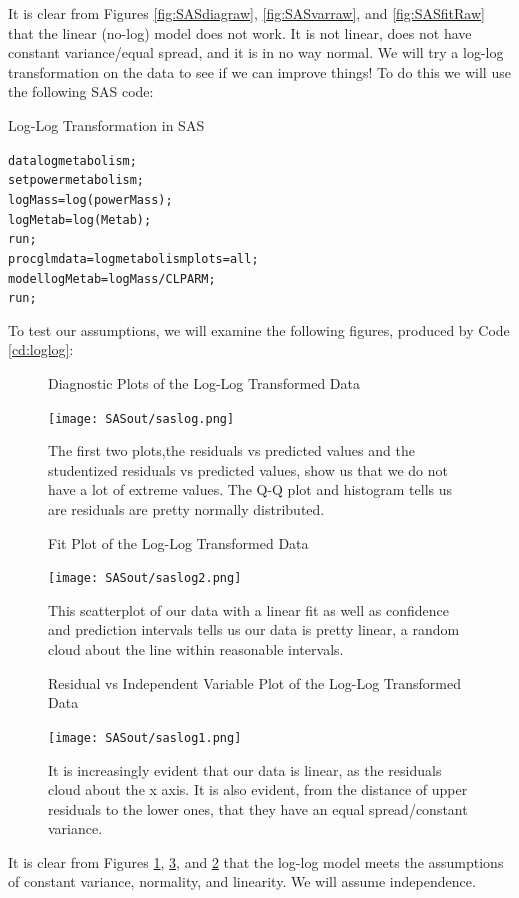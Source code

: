 \documentclass[english]{article}\usepackage[]{graphicx}\usepackage[]{color}
\makeatletter
\newenvironment{kframe}{%
 \def\at@end@of@kframe{}%
 \ifinner\ifhmode%
  \def\at@end@of@kframe{\end{minipage}}%
  \begin{minipage}{\columnwidth}%
 \fi\fi%
 \def\FrameCommand##1{\hskip\@totalleftmargin \hskip-\fboxsep
 \colorbox{shadecolor}{##1}\hskip-\fboxsep
     \hskip-\linewidth \hskip-\@totalleftmargin \hskip\columnwidth}%
 \MakeFramed {\advance\hsize-\width
   \@totalleftmargin\z@ \linewidth\hsize
   \@setminipage}}%
 {\par\unskip\endMakeFramed%
 \at@end@of@kframe}
\newenvironment{knitrout}{}{} %
\makeatother
\begin{document}
It is clear from Figures \ref{fig:SASdiagraw}, \ref{fig:SASvarraw}, and \ref{fig:SASfitRaw} that the linear (no-log) model does not work. It is not linear, does not have constant variance/equal spread, and it is in no way normal. We will try a log-log transformation on the data to see if we can improve things! To do this we will use the following SAS code:
\begin{Code}[H]
	\caption{Log-Log Transformation in SAS}
	\label{cd:loglog}
\begin{knitrout}
\color{fgcolor}\begin{kframe}
\begin{alltt}
data logmetabolism;
set powermetabolism;
logMass=log(powerMass);
logMetab=log(Metab);
run;
proc glm data=logmetabolism plots=all;
model logMetab=logMass /CLPARM;
run;
\end{alltt}
\end{kframe}
\end{knitrout}
\end{Code}
To test our assumptions, we will examine the following figures, produced by Code \ref{cd:loglog}:

\begin{figure}[H]
	\caption{Diagnostic Plots of the Log-Log Transformed Data}
	\label{fig:SASdiagrlog}
	\begin{center}
		\texttt{[image: SASout/saslog.png]}
	\end{center}
	\caption*{The first two plots,the residuals vs predicted values and the studentized residuals vs predicted values, show us that we do not have a lot of extreme values. The Q-Q plot and histogram tells us are residuals are pretty normally distributed.}
\end{figure}
\begin{figure}[H]
	\caption{Fit Plot of the Log-Log Transformed Data}
	\label{fig:SASfitlog}
	\begin{center}
		\texttt{[image: SASout/saslog2.png]}
	\end{center}
	\caption*{This scatterplot of our data with a linear fit as well as confidence and prediction intervals tells us our data is pretty linear, a random cloud about the line within reasonable intervals.}
\end{figure}
\begin{figure}[H]
	\caption{Residual vs Independent Variable Plot of the Log-Log Transformed Data}
	\label{fig:SASvarlog}
	\begin{center}
		\texttt{[image: SASout/saslog1.png]}
	\end{center}
	\caption*{It is increasingly evident that our data is linear, as the residuals cloud about the x axis. It is also evident, from the distance of upper residuals to the lower ones, that they have an equal spread/constant variance.}
\end{figure}
It is clear from Figures \ref{fig:SASdiagrlog}, \ref{fig:SASvarlog}, and \ref{fig:SASfitlog} that the log-log model meets the assumptions of constant variance, normality, and linearity. We will assume independence.
\end{document}

